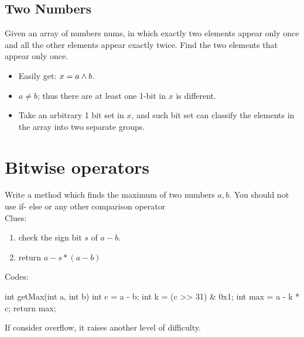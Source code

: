 \subsection{Two Numbers} 
Given an array of numbers nums, in which exactly two elements appear only once and all the other elements appear exactly twice. Find the two elements that appear only once.

\begin{itemize}
\item Easily get: $x = a \wedge b$.
\item $a \neq b$; thus there are at least one 1-bit in $x$ is different.  
\item Take an arbitrary 1 bit set in $x$, and such bit set can classify the elements in the array into two separate groups.
\end{itemize}

\section{Bitwise operators}
 Write a method which finds the maximum of two numbers $a, b$. You should not use if- else or any other comparison operator
\\
Clues:
\begin{enumerate}
\item check the sign bit $s$ of $a-b$.
\item return $a-s*(a-b)$
\end{enumerate}
Codes:
\begin{java}
int getMax(int a, int b) { 
    int c = a - b;
    int k = (c >> 31) & 0x1; 
    int max = a - k * c; 
    return max;
}

\end{java}
If consider overflow, it raises another level of difficulty. 
